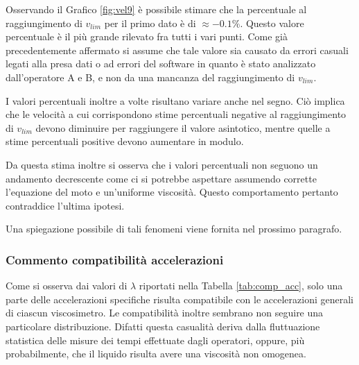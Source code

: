 \documentclass[a4paper,11pt,oneside]{article}
\begin{document}

Osservando il Grafico \ref{fig:vel9} è possibile stimare che la percentuale al raggiungimento di $v_{lim}$ per il primo dato è di $\approx -0.1\%$. Questo valore percentuale è il più grande rilevato fra tutti i vari punti. Come già precedentemente affermato si assume che tale valore sia causato da errori casuali legati alla presa dati o ad errori del software in quanto è stato analizzato dall'operatore A e B, e non da una mancanza del raggiungimento di $v_{lim}$.\newline

I valori percentuali inoltre a volte risultano variare anche nel segno. Ciò implica che le velocità a cui corrispondono stime percentuali negative al raggiungimento di $v_{lim}$ devono diminuire per raggiungere il valore asintotico, mentre quelle a stime percentuali positive devono aumentare in modulo. 

Da questa stima inoltre si osserva che i valori percentuali non seguono un andamento decrescente come ci si potrebbe aspettare assumendo corrette l'equazione del moto e un'uniforme viscosità. Questo comportamento pertanto contraddice l'ultima ipotesi.\newline

Una spiegazione possibile di tali fenomeni viene fornita nel prossimo paragrafo. \newline

\subsubsection*{Commento compatibilità accelerazioni}
Come si osserva dai valori di $\lambda$ riportati nella Tabella \ref{tab:comp_acc}, solo una parte delle accelerazioni specifiche risulta compatibile con le accelerazioni generali di ciascun viscosimetro.
Le compatibilità inoltre sembrano non seguire una particolare distribuzione. Difatti questa casualità deriva dalla fluttuazione statistica delle misure dei tempi effettuate dagli operatori, oppure, più probabilmente, che il liquido risulta avere una viscosità non omogenea.
\end{document}
